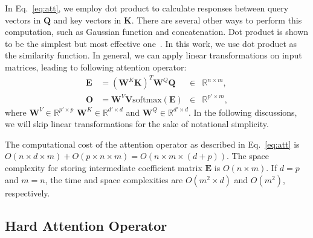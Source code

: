 \documentclass[sigconf]{acmart}
\begin{document}
In Eq.~\ref{eq:att}, we employ dot product to calculate responses
between query vectors in $\boldsymbol Q$ and key vectors in
$\boldsymbol K$. There are several other ways to perform this
computation, such as Gaussian function and concatenation. Dot
product is shown to be the simplest but most effective
one~\cite{wang2018non}. In this work, we use dot product as the
similarity function. In general, we can apply linear transformations
on input matrices, leading to following attention operator:
\begin{equation}
\begin{aligned}
\boldsymbol E &= (\boldsymbol W^K \boldsymbol K)^T \boldsymbol W^Q \boldsymbol Q &\in& \mathbb{R}^{n \times m},\\
\boldsymbol O &= \boldsymbol W^V \boldsymbol V \mbox{softmax}(\boldsymbol E) &\in& \mathbb{R}^{p' \times m},
\end{aligned}
\end{equation}
where $\boldsymbol W^V \in \mathbb{R}^{p' \times p}$ $\boldsymbol
W^K \in \mathbb{R}^{d' \times d}$ and $\boldsymbol W^Q \in
\mathbb{R}^{d' \times d}$. In the following discussions, we will
skip linear transformations for the sake of notational simplicity.

The computational cost of the attention operator as described in
Eq.~\ref{eq:att} is $O(n\times d \times m) + O(p \times n \times m)
= O(n \times m \times (d + p))$. The space complexity for storing
intermediate coefficient matrix $\boldsymbol E$ is $O(n \times m)$.
If $d = p$ and $m = n$, the time and space complexities are
$O(m^2\times d)$ and $O(m^2)$, respectively.

\subsection{Hard Attention Operator}
\end{document}
